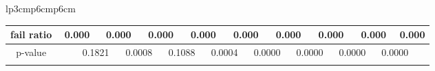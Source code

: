 {\begin{tabular}{lp{3cm}p{6cm}p{6cm}}
\begin{tabular}[h]{m{2.5cm}m{}m{}m{}m{}m{}m{}m{}m{}m{}m{}m{}m{}m{}m{}m{}m{}m{}m{}}
\hline
\multicolumn{1}{c}{fail ratio}&\multicolumn{2}{c}{          0.000}&\multicolumn{2}{c}{    0.000}&\multicolumn{2}{c}{    0.000}&\multicolumn{2}{c}{    0.000}&\multicolumn{2}{c}{    0.000}&\multicolumn{2}{c}{    0.000}&\multicolumn{2}{c}{    0.000}&\multicolumn{2}{c}{    0.000}&\multicolumn{2}{c}{    0.000}\\
\hline
\multicolumn{1}{c}{p-value}&&\multicolumn{2}{c}{0.1821}&\multicolumn{2}{c}{0.0008}&\multicolumn{2}{c}{0.1088}&\multicolumn{2}{c}{0.0004}&\multicolumn{2}{c}{0.0000}&\multicolumn{2}{c}{0.0000}&\multicolumn{2}{c}{0.0000}&\multicolumn{2}{c}{0.0000}\\
&&&&&&&&&&&&&&&&&&\end{tabular}
\end{tabular}
}
